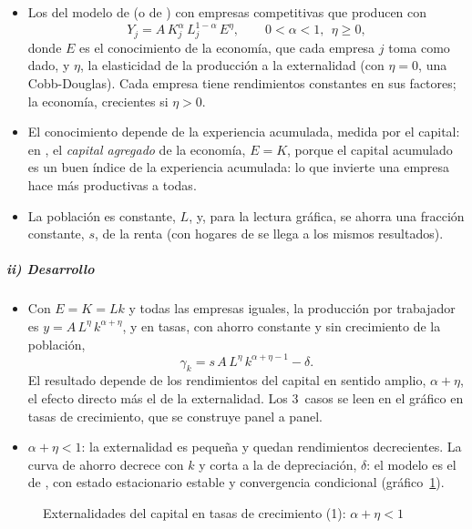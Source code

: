 \documentclass[11pt]{article}
\begin{document}
\begin{itemize}
\item Los del modelo de  (o de ) con empresas competitivas que producen con
  \begin{equation}
  Y_{j}=A\,K_{j}^{\alpha}\,L_{j}^{1-\alpha}\,E^{\eta},\qquad 0<\alpha<1,\ \ \eta\geq0,\label{eq:externalidad}
  \end{equation}
  donde $E$ es el conocimiento de la economía, que cada empresa $j$ toma como dado, y $\eta$, la elasticidad de la producción a la externalidad (con $\eta=0$, una Cobb-Douglas). Cada empresa tiene rendimientos constantes en sus factores; la economía, crecientes si $\eta>0$.
\item El conocimiento depende de la experiencia acumulada, medida por el capital: en \textcite{Romer1986Increasing}, el \emph{capital agregado} de la economía, $E=K$, porque el capital acumulado es un buen índice de la experiencia acumulada: lo que invierte una empresa hace más productivas a todas.
\item La población es constante, $L$, y, para la lectura gráfica, se ahorra una fracción constante, $s$, de la renta (con hogares de  se llega a los mismos resultados).
\end{itemize}

\subparagraph{ii) Desarrollo}

\begin{itemize}
\item Con $E=K=Lk$ y todas las empresas iguales, la producción por trabajador es $y=A\,L^{\eta}\,k^{\alpha+\eta}$, y en tasas, con ahorro constante y sin crecimiento de la población,
  \[\gamma_k=s\,A\,L^{\eta}\,k^{\alpha+\eta-1}-\delta.\]
  El resultado depende de los rendimientos del capital en sentido amplio, $\alpha+\eta$, el efecto directo más el de la externalidad. Los 3~casos se leen en el gráfico en tasas de crecimiento, que se construye panel a panel.
\item \emph{$\alpha+\eta<1$}: la externalidad es pequeña y quedan rendimientos decrecientes. La curva de ahorro decrece con $k$ y corta a la de depreciación, $\delta$: el modelo es el de , con estado estacionario estable y convergencia condicional (gráfico~\ref{fig:externalidades-1}).
\end{itemize}

\begin{figure}[H]
\centering
\caption{Externalidades del capital en tasas de crecimiento (1): $\alpha+\eta<1$}\label{fig:externalidades-1}
\end{figure}
\end{document}
